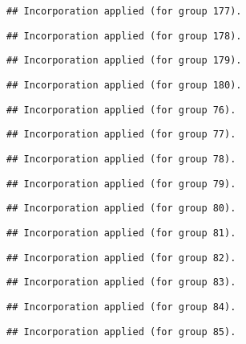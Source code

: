\documentclass[
  landscape]{article}
\begin{document}
\begin{verbatim}
## Incorporation applied (for group 177).
\end{verbatim}

\begin{verbatim}
## Incorporation applied (for group 178).
\end{verbatim}

\begin{verbatim}
## Incorporation applied (for group 179).
\end{verbatim}

\begin{verbatim}
## Incorporation applied (for group 180).
\end{verbatim}

\begin{verbatim}
## Incorporation applied (for group 76).
\end{verbatim}

\begin{verbatim}
## Incorporation applied (for group 77).
\end{verbatim}

\begin{verbatim}
## Incorporation applied (for group 78).
\end{verbatim}

\begin{verbatim}
## Incorporation applied (for group 79).
\end{verbatim}

\begin{verbatim}
## Incorporation applied (for group 80).
\end{verbatim}

\begin{verbatim}
## Incorporation applied (for group 81).
\end{verbatim}

\begin{verbatim}
## Incorporation applied (for group 82).
\end{verbatim}

\begin{verbatim}
## Incorporation applied (for group 83).
\end{verbatim}

\begin{verbatim}
## Incorporation applied (for group 84).
\end{verbatim}

\begin{verbatim}
## Incorporation applied (for group 85).
\end{verbatim}
\end{document}
